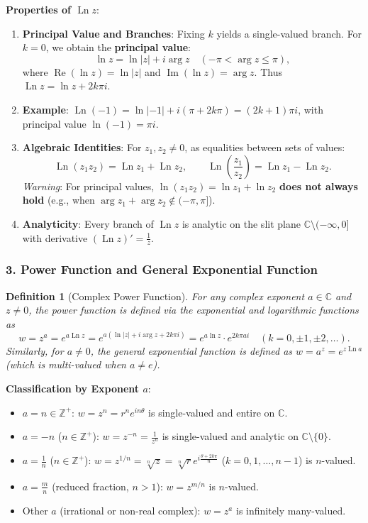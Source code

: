 \documentclass[11pt,a4paper]{article}
\theoremstyle{definitionbreak}
\newtheorem{definition}{Definition}
\theoremstyle{examplebreak}
\theoremstyle{plain}
\begin{document}
\textbf{Properties of $\operatorname{Ln} z$}:
\begin{enumerate}
    \item \textbf{Principal Value and Branches}: Fixing $k$ yields a single-valued branch. For $k = 0$, we obtain the \textbf{principal value}:
    \[
        \ln z = \ln|z| + i\arg z \quad (-\pi < \arg z \le \pi),
    \]
    where $\operatorname{Re}(\ln z) = \ln|z|$ and $\operatorname{Im}(\ln z) = \arg z$. Thus $\operatorname{Ln} z = \ln z + 2k\pi i$.
    \item \textbf{Example}: $\operatorname{Ln}(-1) = \ln|-1| + i(\pi + 2k\pi) = (2k + 1)\pi i$, with principal value $\ln(-1) = \pi i$.
    \item \textbf{Algebraic Identities}: For $z_1, z_2 \neq 0$, as equalities between sets of values:
    \[
        \operatorname{Ln}(z_1 z_2) = \operatorname{Ln} z_1 + \operatorname{Ln} z_2, \qquad \operatorname{Ln}\left(\frac{z_1}{z_2}\right) = \operatorname{Ln} z_1 - \operatorname{Ln} z_2.
    \]
    \emph{Warning}: For principal values, $\ln(z_1 z_2) = \ln z_1 + \ln z_2$ \textbf{does not always hold} (e.g., when $\arg z_1 + \arg z_2 \notin (-\pi, \pi]$).
    \item \textbf{Analyticity}: Every branch of $\operatorname{Ln} z$ is analytic on the slit plane $\mathbb{C} \setminus (-\infty, 0]$ with derivative $(\operatorname{Ln} z)' = \frac{1}{z}$.
\end{enumerate}

\subsubsection{3. Power Function and General Exponential Function}

\begin{definition}[Complex Power Function]
For any complex exponent $a \in \mathbb{C}$ and $z \neq 0$, the power function is defined via the exponential and logarithmic functions as
\[
    w = z^a = e^{a \operatorname{Ln} z} = e^{a(\ln|z| + i\arg z + 2k\pi i)} = e^{a \ln z} \cdot e^{2k\pi a i} \quad (k = 0, \pm 1, \pm 2, \dots).
\]
Similarly, for $a \neq 0$, the general exponential function is defined as $w = a^z = e^{z \operatorname{Ln} a}$ (which is multi-valued when $a \neq e$).
\end{definition}

\textbf{Classification by Exponent $a$}:
\begin{itemize}
    \item $a = n \in \mathbb{Z}^+$: $w = z^n = r^n e^{in\theta}$ is single-valued and entire on $\mathbb{C}$.
    \item $a = -n$ ($n \in \mathbb{Z}^+$): $w = z^{-n} = \frac{1}{z^n}$ is single-valued and analytic on $\mathbb{C} \setminus \{0\}$.
    \item $a = \frac{1}{n}$ ($n \in \mathbb{Z}^+$): $w = z^{1/n} = \sqrt[n]{z} = \sqrt[n]{r} e^{i\frac{\theta + 2k\pi}{n}}$ ($k = 0, 1, \dots, n-1$) is $n$-valued.
    \item $a = \frac{m}{n}$ (reduced fraction, $n > 1$): $w = z^{m/n}$ is $n$-valued.
    \item Other $a$ (irrational or non-real complex): $w = z^a$ is infinitely many-valued.
\end{itemize}
\end{document}
